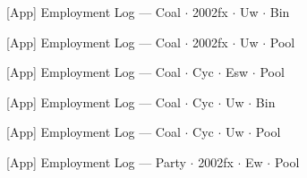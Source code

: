 \documentclass[aspectratio=169,10pt]{beamer}
\newcommand{\tabledir}{../tables/firm}
\begin{document}
\begin{frame}[t,shrink=5]{[App] Employment Log --- Coal $\cdot$ 2002fx $\cdot$ Uw $\cdot$ Bin}
\begin{center}\footnotesize

\end{center}
\end{frame}

\begin{frame}[t,shrink=5]{[App] Employment Log --- Coal $\cdot$ 2002fx $\cdot$ Uw $\cdot$ Pool}
\begin{center}\footnotesize

\end{center}
\end{frame}

\begin{frame}[t,shrink=5]{[App] Employment Log --- Coal $\cdot$ Cyc $\cdot$ Esw $\cdot$ Pool}
\begin{center}\footnotesize

\end{center}
\end{frame}

\begin{frame}[t,shrink=5]{[App] Employment Log --- Coal $\cdot$ Cyc $\cdot$ Uw $\cdot$ Bin}
\begin{center}\footnotesize

\end{center}
\end{frame}

\begin{frame}[t,shrink=5]{[App] Employment Log --- Coal $\cdot$ Cyc $\cdot$ Uw $\cdot$ Pool}
\begin{center}\footnotesize

\end{center}
\end{frame}

\begin{frame}[t,shrink=5]{[App] Employment Log --- Party $\cdot$ 2002fx $\cdot$ Ew $\cdot$ Pool}
\begin{center}\footnotesize

\end{center}
\end{frame}
\end{document}
